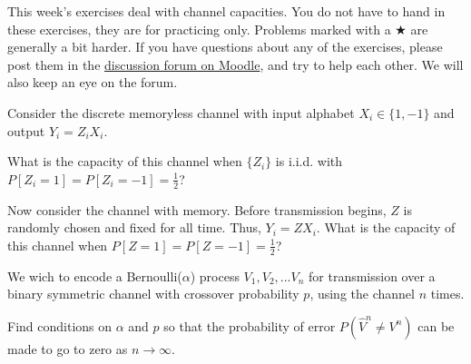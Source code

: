 \documentclass[a4paper,10pt,landscape,twocolumn]{scrartcl}
\begin{document}
\practiceproblems

{\sffamily\noindent
This week's exercises deal with channel capacities. You do not have to hand in these exercises, they are for practicing only. Problems marked with a $\bigstar$ are generally a bit harder. If you have questions about any of the exercises, please post them in the \href{https://www.moodle.ch/lms/mod/forum/view.php?id=1761}{discussion forum on Moodle}, and try to help each other. We will also keep an eye on the forum.
}

\begin{exercise}
Consider the discrete memoryless channel with input alphabet $X_i \in \{1,-1\}$ and output $Y_i = Z_iX_i$.
\begin{subex}
What is the capacity of this channel when $\{Z_i\}$ is i.i.d. with $P[Z_i = 1] = P[Z_i = -1] = \frac{1}{2}$?
\end{subex}
\begin{subex}
Now consider the channel with memory. Before transmission begins, $Z$ is randomly chosen and fixed for all time. Thus, $Y_i = ZX_i$. What is the capacity of this channel when $P[Z = 1] = P[Z = -1] = \frac{1}{2}$?
\end{subex}
\end{exercise}

\begin{exercise}
We wich to encode a Bernoulli($\alpha$) process $V_1, V_2, ... V_n$ for transmission over a binary symmetric channel with crossover probability $p$, using the channel $n$ times.
\begin{center}
\end{center}

Find conditions on $\alpha$ and $p$ so that the probability of error $P(\hat{V}^n \neq V^n)$ can be made to go to zero as $n \to \infty$.
\end{exercise}
\end{document}
